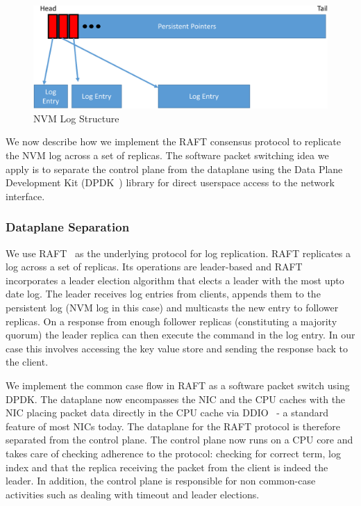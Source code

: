 \documentclass[10pt, preprint, nonatbib]{sigplanconf}
\begin{document}
\begin{figure}
\centering
\includegraphics[scale=0.3]{figures2/nvm_log.pdf}
\hspace{-0.2in}
\caption{NVM Log Structure}
\label{fig:nvm_log}
\end{figure}

We now describe how we implement the RAFT consensus protocol to replicate the
NVM log across a set of replicas. The software packet switching idea we apply is
to separate the control plane from the dataplane using the Data Plane
Development Kit (DPDK~\cite{dpdk}) library for direct userspace access to the
network interface.

\subsubsection{Dataplane Separation}
We use RAFT~\cite{raft} as the underlying protocol for log replication. RAFT
replicates a log across a set of replicas. Its operations are leader-based and
RAFT incorporates a leader election algorithm that elects a leader with the most
upto date log. The leader receives log entries from clients, appends them to the
persistent log (NVM log in this case) and multicasts the new entry to follower
replicas. On a response from enough follower replicas (constituting a majority
quorum) the leader replica can then execute the command in the log entry. In
our case this involves accessing the key value store and sending the response
back to the client.

We implement the common case flow in RAFT as a software packet switch using
DPDK. The dataplane now encompasses the NIC and the CPU caches with the NIC
placing packet data directly in the CPU cache via DDIO~\cite{ddio} - a standard
feature of most NICs today. The dataplane for the RAFT protocol is therefore
separated from the control plane. The control plane now runs on a CPU core and
takes care of checking adherence to the protocol: checking for correct term, log
index and that the replica receiving the packet from the client is indeed the
leader. In addition, the control plane is responsible for non common-case
activities such as dealing with timeout and leader elections.
\end{document}
